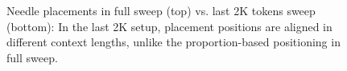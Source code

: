 \begin{figure}[b!]
    \centering
    \caption{Needle placements in full sweep (top) vs. last 2K tokens sweep (bottom): In the last 2K setup, placement positions are aligned in different context lengths, unlike the proportion-based positioning in full sweep.}
    \label{fig:full_vs_last2K_demonstrate}
\end{figure}